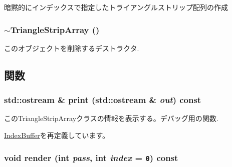 暗黙的にインデックスで指定したトライアングルストリップ配列の作成 \hypertarget{classm3g_1_1TriangleStripArray_1cb3853bf79b7710d57044da818d2cde}{
\subsubsection[{$\sim$TriangleStripArray}]{\setlength{\rightskip}{0pt plus 5cm}$\sim${\bf TriangleStripArray} ()}}
\label{classm3g_1_1TriangleStripArray_1cb3853bf79b7710d57044da818d2cde}


このオブジェクトを削除するデストラクタ. 

\subsection{関数}
\hypertarget{classm3g_1_1TriangleStripArray_6fea17fa1532df3794f8cb39cb4f911f}{
\subsubsection[{print}]{\setlength{\rightskip}{0pt plus 5cm}std::ostream \& print (std::ostream \& {\em out}) const}}
\label{classm3g_1_1TriangleStripArray_6fea17fa1532df3794f8cb39cb4f911f}


このTriangleStripArrayクラスの情報を表示する。デバッグ用の関数. 

\hyperlink{classm3g_1_1IndexBuffer_6fea17fa1532df3794f8cb39cb4f911f}{IndexBuffer}を再定義しています。\hypertarget{classm3g_1_1TriangleStripArray_1efcb1973989d9963d5bd6d03065d389}{
\subsubsection[{render}]{\setlength{\rightskip}{0pt plus 5cm}void render (int {\em pass}, \/  int {\em index} = {\tt 0}) const}}
\label{classm3g_1_1TriangleStripArray_1efcb1973989d9963d5bd6d03065d389}


